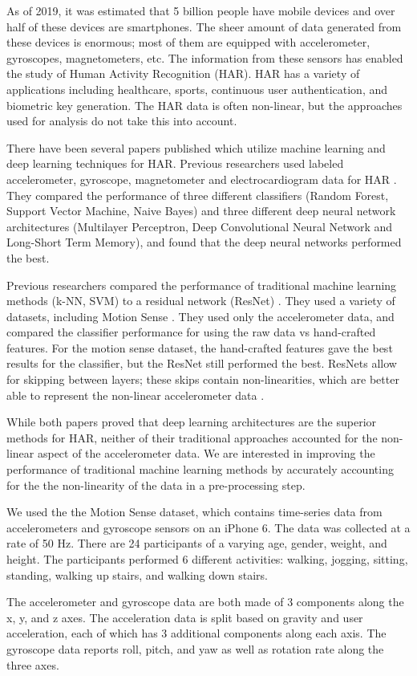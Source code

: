 As of 2019, it was estimated that 5 billion people have mobile devices and over half of these devices are smartphones. The sheer amount of data generated from these devices is enormous; most of them are equipped with accelerometer, gyroscopes, magnetometers, etc. The information from these sensors has enabled  the study of Human Activity Recognition (HAR). HAR has a variety of applications including healthcare, sports, continuous user authentication, and biometric key generation. The HAR data is often non-linear, but the approaches used for analysis do not take this into account.

There have been several papers published which utilize machine learning and deep learning techniques for HAR. Previous researchers used labeled accelerometer, gyroscope, magnetometer and electrocardiogram data for HAR \cite{masum2019human}. They compared the performance of three different classifiers (Random Forest, Support Vector Machine, Naive Bayes) and three different deep neural network architectures (Multilayer Perceptron, Deep Convolutional Neural Network and Long-Short Term Memory), and found that the deep neural networks performed the best. 

Previous researchers compared the performance of traditional machine learning methods (k-NN, SVM) to a residual network (ResNet) \cite{ferrari2019hand}. They used a variety of datasets, including Motion Sense \cite{malekzadeh2018protecting}. They used only the accelerometer data, and compared the classifier performance for using the raw data vs hand-crafted features. For the motion sense dataset, the hand-crafted features gave the best results for the classifier, but the ResNet still performed the best. ResNets allow for skipping between layers; these skips contain non-linearities, which are better able to represent the non-linear accelerometer data \cite{he2016deep}.

While both papers proved that deep learning architectures are the superior methods for HAR, neither of their traditional approaches accounted for the non-linear aspect of the accelerometer data. We are interested in improving the performance of traditional machine learning methods by accurately accounting for the the non-linearity of the data in a pre-processing step. 

We used the the Motion Sense dataset, which contains time-series data from accelerometers and gyroscope sensors on an iPhone 6. The data was collected at a rate of 50 Hz. There are 24 participants of a varying age, gender, weight, and height. The participants performed 6 different activities: walking, jogging, sitting, standing, walking up stairs, and walking down stairs. 

The accelerometer and gyroscope data are both made of 3 components along the x, y, and z axes. The acceleration data is split based on gravity and user acceleration, each of which has 3 additional components along each axis. The gyroscope data reports roll, pitch, and yaw as well as rotation rate along the three axes.
